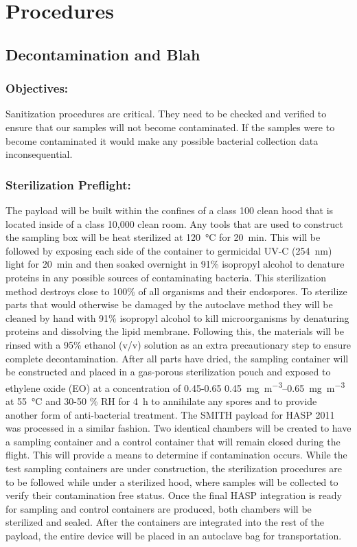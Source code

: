 \section{Procedures}
\label{sec:Procedures}

\subsection{Decontamination and Blah}
\label{subsec:Decontamination}

\subsubsection{Objectives:}
Sanitization procedures are critical. They need to be checked and verified to ensure that our samples will not become contaminated. If the samples were to become contaminated it would make any possible bacterial collection data inconsequential.

\subsubsection{Sterilization Preflight:}
The payload will be built within the confines of a class 100 clean hood that is located inside of a class 10,000 clean room. Any tools that are used to construct the sampling box will be heat sterilized at \SI{120}{\celsius} for \SI{20}{\minute}. This will be followed by exposing each side of the container to germicidal UV-C (\SI{254}{\nano\meter}) light for \SI{20}{\minute} and then soaked overnight in 91\% isopropyl alcohol to denature proteins in any possible sources of contaminating bacteria. This sterilization method destroys close to 100\% of all organisms and their endospores. To sterilize parts that would otherwise be damaged by the autoclave method they will be cleaned by hand with 91\% isopropyl alcohol to kill microorganisms by denaturing proteins and dissolving the lipid membrane. Following this, the materials will be rinsed with a 95\% ethanol (v/v) solution as an extra precautionary step to ensure complete decontamination. After all parts have dried, the sampling container will be constructed and placed in a gas-porous sterilization pouch and exposed to ethylene oxide (EO) at a concentration of 0.45-0.65 \SIrange{0.45}{0.65}{\milli\gram\per\meter\cubed} at \SI{55}{\celsius} and 30-50 \% RH for \SI{4}{\hour} to annihilate any spores and to provide another form of anti-bacterial treatment. The SMITH payload for HASP 2011 was processed in a similar fashion. Two identical chambers will be created to have a sampling container and a control container that will remain closed during the flight. This will provide a means to determine if contamination occurs. While the test sampling containers are under construction, the sterilization procedures are to be followed while under a sterilized hood, where samples will be collected to verify their contamination free status. Once the final HASP integration is ready for sampling and control containers are produced, both chambers will be sterilized and sealed. After the containers are integrated into the rest of the payload, the entire device will be placed in an autoclave bag for transportation.


